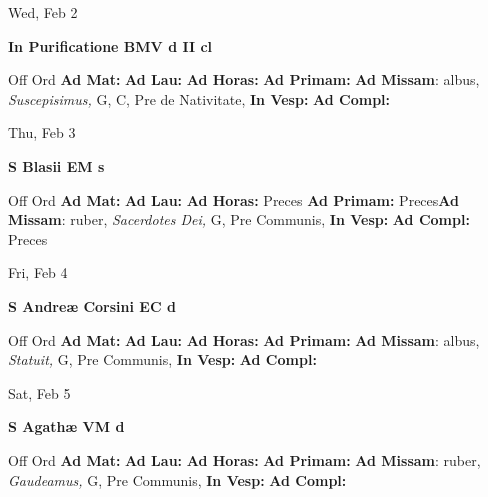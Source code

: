 \documentclass[10pt]{book}
\begin{document}
\begin{center}
\begin{minipage}{3.5in}
\vspace{2em}
\begin{center}Wed, Feb 2
\end{center}
\textbf{ \large In Purificatione BMV
\textnormal{\normalsize d II cl}}

\begin{justify}Off Ord
\textbf{Ad Mat: }
\textbf{Ad Lau: }
\textbf{Ad Horas: }
\textbf{Ad Primam: }\textbf{Ad Missam}: albus, \textit{Suscepisimus,} G, C, Pre de Nativitate, 
\textbf{In Vesp: }
\textbf{Ad Compl: }
\end{justify}
\end{minipage}
\end{center}

\begin{center}
\begin{minipage}{3.5in}
\vspace{2em}
\begin{center}Thu, Feb 3
\end{center}
\textbf{ \large S Blasii EM
\textnormal{\normalsize s}}

\begin{justify}Off Ord
\textbf{Ad Mat: }
\textbf{Ad Lau: }
\textbf{Ad Horas: }Preces
\textbf{Ad Primam: }Preces\textbf{Ad Missam}: ruber, \textit{Sacerdotes Dei,} G, Pre Communis, 
\textbf{In Vesp: }
\textbf{Ad Compl: }Preces
\end{justify}
\end{minipage}
\end{center}

\begin{center}
\begin{minipage}{3.5in}
\vspace{2em}
\begin{center}Fri, Feb 4
\end{center}
\textbf{ \large S Andreæ Corsini EC
\textnormal{\normalsize d}}

\begin{justify}Off Ord
\textbf{Ad Mat: }
\textbf{Ad Lau: }
\textbf{Ad Horas: }
\textbf{Ad Primam: }\textbf{Ad Missam}: albus, \textit{Statuit,} G, Pre Communis, 
\textbf{In Vesp: }
\textbf{Ad Compl: }
\end{justify}
\end{minipage}
\end{center}

\begin{center}
\begin{minipage}{3.5in}
\vspace{2em}
\begin{center}Sat, Feb 5
\end{center}
\textbf{ \large S Agathæ VM
\textnormal{\normalsize d}}

\begin{justify}Off Ord
\textbf{Ad Mat: }
\textbf{Ad Lau: }
\textbf{Ad Horas: }
\textbf{Ad Primam: }\textbf{Ad Missam}: ruber, \textit{Gaudeamus,} G, Pre Communis, 
\textbf{In Vesp: }
\textbf{Ad Compl: }
\end{justify}
\end{minipage}
\end{center}
\end{document}
